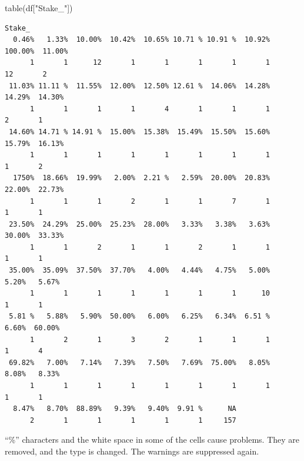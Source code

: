 \documentclass[
  letterpaper,
  DIV=11,
  numbers=noendperiod]{scrreprt}
\newenvironment{Shaded}{\begin{snugshade}}{\end{snugshade}}
\newcommand{\AttributeTok}[1]{\textcolor[rgb]{0.40,0.45,0.13}{#1}}
\newcommand{\FunctionTok}[1]{\textcolor[rgb]{0.28,0.35,0.67}{#1}}
\newcommand{\NormalTok}[1]{\textcolor[rgb]{0.00,0.23,0.31}{#1}}
\newcommand{\OtherTok}[1]{\textcolor[rgb]{0.00,0.23,0.31}{#1}}
\newcommand{\SpecialCharTok}[1]{\textcolor[rgb]{0.37,0.37,0.37}{#1}}
\newcommand{\StringTok}[1]{\textcolor[rgb]{0.13,0.47,0.30}{#1}}
\begin{document}
\begin{Shaded}
\begin{Highlighting}[]
\FunctionTok{table}\NormalTok{(df[}\StringTok{"Stake\_"}\NormalTok{])}
\end{Highlighting}
\end{Shaded}

\begin{verbatim}
Stake_
  0.46%   1.33%  10.00%  10.42%  10.65% 10.71 % 10.91 %  10.92% 100.00%  11.00% 
      1       1      12       1       1       1       1       1      12       2 
 11.03% 11.11 %  11.55%  12.00%  12.50% 12.61 %  14.06%  14.28%  14.29%  14.30% 
      1       1       1       1       4       1       1       1       2       1 
 14.60% 14.71 % 14.91 %  15.00%  15.38%  15.49%  15.50%  15.60%  15.79%  16.13% 
      1       1       1       1       1       1       1       1       1       2 
  1750%  18.66%  19.99%   2.00%  2.21 %   2.59%  20.00%  20.83%  22.00%  22.73% 
      1       1       1       2       1       1       7       1       1       1 
 23.50%  24.29%  25.00%  25.23%  28.00%   3.33%   3.38%   3.63%  30.00%  33.33% 
      1       1       2       1       1       2       1       1       1       1 
 35.00%  35.09%  37.50%  37.70%   4.00%   4.44%   4.75%   5.00%   5.20%   5.67% 
      1       1       1       1       1       1       1      10       1       1 
 5.81 %   5.88%   5.90%  50.00%   6.00%   6.25%   6.34%  6.51 %   6.60%  60.00% 
      1       2       1       3       2       1       1       1       1       4 
 69.82%   7.00%   7.14%   7.39%   7.50%   7.69%  75.00%   8.05%   8.08%   8.33% 
      1       1       1       1       1       1       1       1       1       1 
  8.47%   8.70%  88.89%   9.39%   9.40%  9.91 %      NA 
      2       1       1       1       1       1     157 
\end{verbatim}

``\%'' characters and the white space in some of the cells cause
problems. They are removed, and the type is changed. The warnings are
suppressed again.

\begin{Shaded}
\end{Shaded}
\end{document}
